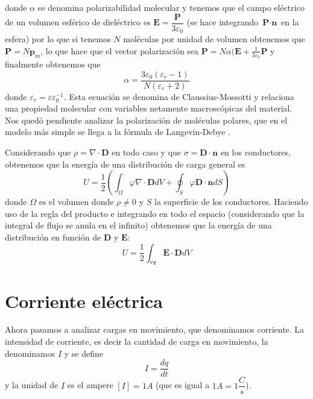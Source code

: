 \documentclass[11pt,a4paper]{article}
\numberwithin{equation}{section}
\begin{document}
    donde $\alpha$ se denomina polarizabilidad molecular y tenemos que el campo eléctrico de un volumen esférico de dieléctrico es $\textbf{E} = \dfrac{\textbf{P}}{3\varepsilon_0}$ (se hace integrando $\textbf{P}\cdot\textbf{n}$ en la esfera) por lo que si tenemos $N$ moléculas por unidad de volumen obtenemos que $\textbf{P} = N \textbf{p}_m$, lo que hace que el vector polarización sea $\textbf{P} = N \alpha(\textbf{E} + \frac{1}{3\varepsilon_0} \textbf{P}$ y finalmente obtenemos que
    \begin{equation}
        \alpha = \frac{3 \varepsilon_0 (\varepsilon_r - 1)}{N(\varepsilon_r +2)}
        \label{eq:e_claussius_mossotti}
    \end{equation}
    donde $\varepsilon_r = \varepsilon \varepsilon_0^{-1}$. Esta ecuación se denomina de Claussius-Mossotti y relaciona una propiedad molecular con variables netamente macroscópicas del material.
    Nos quedó pendiente analizar la polarización de moléculas polares, que en el modelo más simple se llega a la fórmula de Langevin-Debye \cite[p.~132]{reitz}. 
    
    Considerando que $\rho = \nabla \cdot \textbf{D}$ en todo caso y que $\sigma = \textbf{D} \cdot \textbf{n}$ en los conductores, obtenemos que la energía de una distribución de carga general es
    \begin{equation}
        U = \frac{1}{2} \left(\int_{\Omega} \varphi \nabla \cdot \textbf{D} dV + \oint_{S} \varphi \textbf{D} \cdot \textbf{n} dS\right)
        \label{eq:e_energia_general}
    \end{equation}
    donde $\Omega$ es el volumen donde $\rho \neq 0$ y $S$ la superficie de los conductores. Haciendo uso de la regla del producto e integrando en todo el espacio (considerando que la integral de flujo se anula en el infinito) obtenemos que la energía de una distribución en función de $\textbf{D}$ y $\textbf{E}$:
    \begin{equation}
        U = \frac{1}{2} \int_{\forall \textbf{r}} \textbf{E} \cdot \textbf{D} dV
        \label{eq:e_energia_general_campo}
    \end{equation}

\section{Corriente eléctrica}
\label{sec:corriente}
Ahora pasamos a analizar cargas en movimiento, que denominamos corriente. La intensidad de corriente, es decir la cantidad de carga en movimiento, la denominamos $I$ y se define
\begin{equation}
    I = \frac{dq}{dt}
    \label{eq:corriente_definicion}
\end{equation}
y la unidad de $I$ es el ampere $[I] = 1A$ (que es igual a $1A = 1\dfrac{C}{s}$). 
\end{document}

